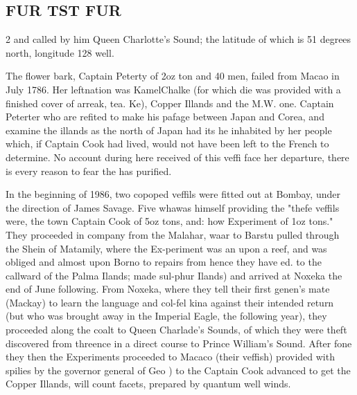 \documentclass[10pt]{article}
\begin{document}
\subsection*{FUR TST FUR}
\begin{multicols}{2}\raggedcolumns
and called by him Queen Charlotte’s Sound; the latitude of which is 51 degrees north, longitude 128 well.

The flower bark, Captain Peterty of 2oz ton and 40 men, failed from Macao in July 1786. Her leftnation was KamelChalke (for which die was provided with a finished cover of arreak, tea. Ke), Copper Illands and the M.W. one. Captain Peterter who are refited to make his pafage between Japan and Corea, and examine the illands as the north of Japan had its he inhabited by her people which, if Captain Cook had lived, would not have been left to the French to determine. No account during here received of this veffi face her departure, there is every reason to fear the has purified.

In the beginning of 1986, two copoped veffils were fitted out at Bombay, under the direction of James Savage. Five whawas himself providing the "thefe veffils were, the town Captain Cook of 5oz tons, and: how Experiment of 1oz tons." They proceeded in company from the Malahar, waar to Barstu pulled through the Shein of Matamily, where the Ex-periment was an upon a reef, and was obliged and almost upon Borno to repairs from hence they have ed. to the callward of the Palma Ilands; made sul-phur Ilands) and arrived at Noxeka the end of June following. From Noxeka, where they tell their first genen's mate (Mackay) to learn the language and col-fel kina against their intended return (but who was brought away in the Imperial Eagle, the following year), they proceeded along the coalt to Queen Charlade's Sounds, of which they were theft discovered from threence in a direct course to Prince William's Sound. After fone they then the Experiments proceeded to Macaco (their veffish) provided with spilies by the governor general of Geo ) to the Captain Cook advanced to get the Copper Illands, will count facets, prepared by quantum well winds.


\end{multicols}
\end{document}
